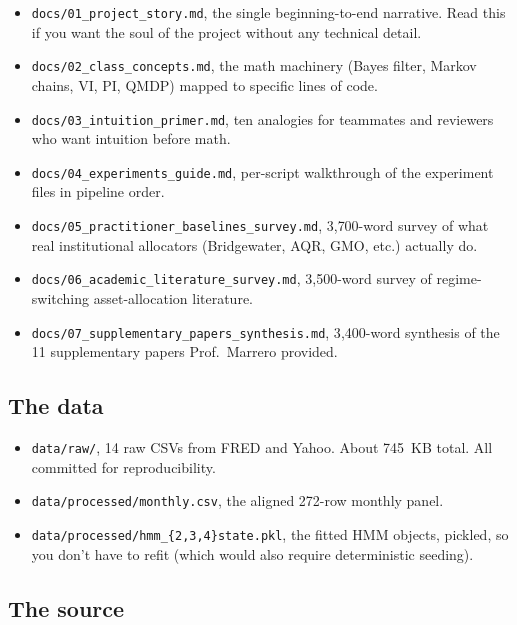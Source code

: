 \documentclass[11pt]{article}
\begin{document}
\begin{itemize}
  \item \texttt{docs/01\_project\_story.md}, the single beginning-to-end narrative. Read this if you want the soul of the project without any technical detail.
  \item \texttt{docs/02\_class\_concepts.md}, the math machinery (Bayes filter, Markov chains, VI, PI, QMDP) mapped to specific lines of code.
  \item \texttt{docs/03\_intuition\_primer.md}, ten analogies for teammates and reviewers who want intuition before math.
  \item \texttt{docs/04\_experiments\_guide.md}, per-script walkthrough of the experiment files in pipeline order.
  \item \texttt{docs/05\_practitioner\_baselines\_survey.md}, 3{,}700-word survey of what real institutional allocators (Bridgewater, AQR, GMO, etc.) actually do.
  \item \texttt{docs/06\_academic\_literature\_survey.md}, 3{,}500-word survey of regime-switching asset-allocation literature.
  \item \texttt{docs/07\_supplementary\_papers\_synthesis.md}, 3{,}400-word synthesis of the 11 supplementary papers Prof.\ Marrero provided.
\end{itemize}

\subsection{The data}

\begin{itemize}
  \item \texttt{data/raw/}, 14 raw CSVs from FRED and Yahoo. About 745~KB total. All committed for reproducibility.
  \item \texttt{data/processed/monthly.csv}, the aligned 272-row monthly panel.
  \item \texttt{data/processed/hmm\_\{2,3,4\}state.pkl}, the fitted HMM objects, pickled, so you don't have to refit (which would also require deterministic seeding).
\end{itemize}

\subsection{The source}
\end{document}
